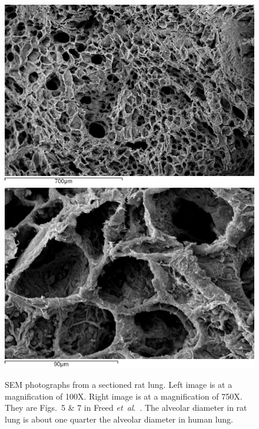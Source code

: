 \begin{figure}
    {\par\centering
        \resizebox*{0.45\textwidth}{0.25\textheight}
        {\includegraphics{figures/ratLung100X.jpg}} 
        \resizebox*{0.45\textwidth}{0.25\textheight}
        {\includegraphics{figures/ratLung750X.jpg}}
        \par}
    \caption{SEM photographs from a sectioned rat lung.  Left image is at a magnification of 100X.  Right image is at a magnification of 750X. They are Figs.~5 \& 7 in Freed \textit{et~al}.\ \cite{Freedetal12}. The alveolar diameter in rat lung is about one quarter the alveolar diameter in human lung.}
    \label{figRatLung}
\end{figure}

